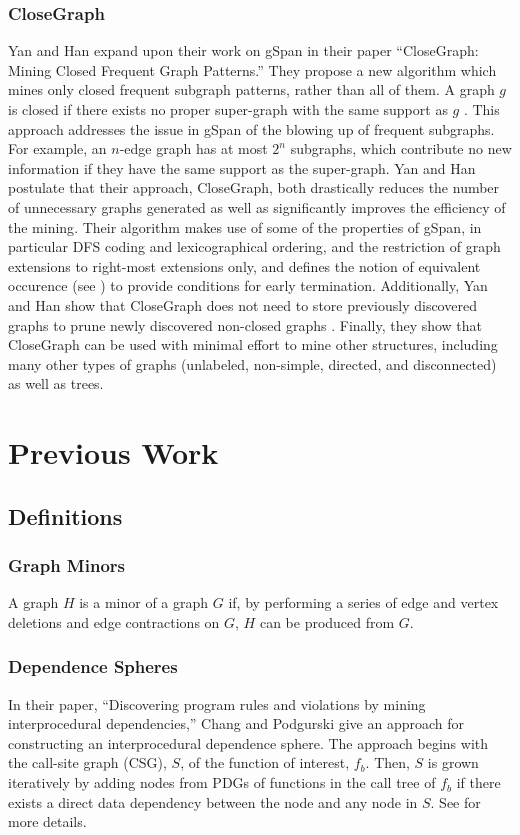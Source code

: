 \documentclass[12pt]{article}
\begin{document}
\subsubsection{CloseGraph}
Yan and Han expand upon their work on gSpan in their paper
``CloseGraph: Mining Closed Frequent Graph Patterns.'' They propose a new
algorithm which mines only closed frequent subgraph patterns, rather than all
of them. A graph $g$ is closed if there exists no proper super-graph with the
same support as $g$ \cite{Yan:2003:CMC:956750.956784}. This approach addresses
the issue in gSpan of the blowing up of frequent subgraphs. For example, an
$n$-edge graph has at most $2^n$ subgraphs, which contribute no new
information if they have the same support as the super-graph. Yan and Han
postulate that their approach, CloseGraph, both drastically reduces the number
of unnecessary graphs generated as well as significantly improves the
efficiency of the mining\cite{Yan:2003:CMC:956750.956784}. Their algorithm
makes use of some of the properties of gSpan, in particular DFS coding and
lexicographical ordering, and the restriction of graph extensions to right-most
extensions only, and defines the notion of equivalent occurence (see
\cite{Yan:2003:CMC:956750.956784}) to provide conditions for early
termination. Additionally, Yan and Han show that CloseGraph does not need to
store previously discovered graphs to prune newly discovered non-closed graphs
\cite{Yan:2003:CMC:956750.956784}. Finally, they show that CloseGraph can be
used with minimal effort to mine other structures, including many other types
of graphs (unlabeled, non-simple, directed, and disconnected) as well as trees.
\\

\section{Previous Work}
\subsection{Definitions}
\subsubsection{Graph Minors}
A graph $H$ is a minor of a graph $G$ if, by performing a series of edge and
vertex deletions and edge contractions on $G$, $H$ can be produced from $G$.

\subsubsection{Dependence Spheres}
In their paper, ``Discovering program rules and violations by mining
interprocedural dependencies,'' Chang and Podgurski give an approach for
constructing an interprocedural dependence sphere. The approach begins with
the call-site graph (CSG), $S$, of the function of interest, $f_b$. Then, $S$
is grown iteratively by adding nodes from PDGs of functions in the call tree
of $f_b$ if there exists a direct data dependency between the node and any
node in $S$. See \cite{DBLP:journals/smr/ChangP12} for more details.
\end{document}
